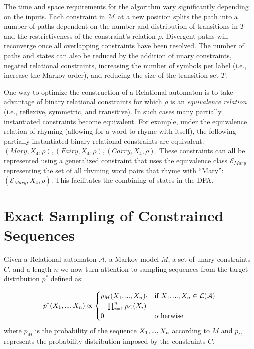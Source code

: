 \documentclass[phd,electronic,oneside,twosidetoc,letterpaper,chaptercenter,parttop,lof,lot]{byumsphd}
\newcommand\mydots{\hbox to .75em{.\hss.\hss.}}
\begin{document}
The time and space requirements for the algorithm vary significantly depending on the inputs. Each constraint in $\mathcal{M}$ at a new position splits the path into a number of paths dependent on the number and distribution of transitions in $T$ and the restrictiveness of the constraint's relation $\rho$. Divergent paths will reconverge once all overlapping constraints have been resolved. The number of paths and states can also be reduced by the addition of unary constraints, negated relational constraints, increasing the number of symbols per label (i.e., increase the Markov order), and reducing the size of the transition set $T$.

One way to optimize the construction of a {\sc Relational} automaton is to take advantage of binary relational constraints for which $\rho$ is an \emph{equivalence relation} (i.e., reflexive, symmetric, and transitive). In such cases many partially instantiated constraints become equivalent. For example, under the equivalence relation of rhyming (allowing for a word to rhyme with itself), the following partially instantiated binary relational constraints are equivalent: $(Mary,X_4,\rho),(Fairy,X_4,\rho),(Carry,X_4,\rho)$. These constraints can all be represented using a generalized constraint that uses the equivalence class $\mathcal{E}_{Mary}$ representing the set of all rhyming word pairs that rhyme with ``Mary'': $(\mathcal{E}_{Mary},X_4,\rho)$. This facilitates the combining of states in the DFA.

\section{Exact Sampling of Constrained Sequences}

Given a {\sc Relational} automaton $\mathcal{A}$, a Markov model $M$, a set of unary constraints $C$, and a length $n$ we now turn attention to sampling sequences from the target distribution $p^*$ defined as:

\[
  p^*(X_1,\mydots,X_n) \propto   
  \begin{cases}
	p_M(X_1,\mydots,X_n)\cdot & \text{if } X_1,\mydots,X_n \in 	\mathcal{L}(\mathcal{A})\\
    \quad \prod_{i=1}^n p_C(X_i)\\
	0 & \text{otherwise}
  \end{cases}
\]
\noindent where $p_M$ is the probability of the sequence $X_1,\mydots,X_n$ according to $M$ and $p_C$ represents the probability distribution imposed by the constraints $C$.
\end{document}
